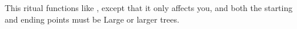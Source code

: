 \spelleffect This ritual functions like , except that it only affects you, and both the starting and ending points must be Large or larger trees.
\begin{comment}
You gain the ability to enter trees and move from inside one tree to inside another tree. The first tree you enter and all others you enter must be of the same kind, must be living, and must have girth at least equal to yours. By moving into an oak tree (for example), you instantly know the location of all other oak trees within transport range (see below) and may choose whether you want to pass into one or simply step back out of the tree you moved into. You may choose to pass to any tree of the appropriate kind within the transport range as shown on the following table.
\begin{dtable}
    \begin{tabularx}{\columnwidth}{>{\lcol}X >{\lcol}X}
        Type of Tree & Transport Range \\
        Oak, ash, yew & 3,000 feet \\
        Elm, linden & 2,000 feet \\
        Other deciduous & 1,500 feet \\
        Any coniferous & 1,000 feet \\
        All other trees & 500 feet
    \end{tabularx}
\end{dtable}
\par You may move into a tree up to one time per caster level (passing from one tree to another counts only as moving into one tree). The spell lasts until the duration expires or you exit a tree. Each transport is a full-round action.
\par You can, at your option, remain within a tree without transporting yourself, but you are forced out when the spell ends. If the tree in which you are concealed is chopped down or burned, you are slain if you do not exit before the process is complete.
\end{comment}

